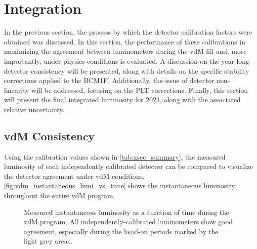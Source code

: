 \newpage

\section{Integration}

In the previous section, the process by which the detector calibration factors were obtained was discussed. In this section, the performance of these calibrations in maximizing the agreement between luminometers during the vdM fill and, more importantly, under physics conditions is evaluated. A discussion on the year-long detector consistency will be presented, along with details on the specific stability corrections applied to the BCM1F. Additionally, the issue of detector non-linearity will be addressed, focusing on the PLT corrections. Finally, this section will present the final integrated luminosity for 2023, along with the associated relative uncertainty.

\newpage

\subsection{vdM Consistency}
\label{subsec:vdm_consistency}

Using the calibration values shown in \autoref{tab:xsec_summary}, the measured luminosity of each independently calibrated detector can be compared to visualize the detector agreement under vdM conditions. \autoref{fig:vdm_instantaneous_lumi_vs_time} shows the instantaneous luminosity throughout the entire vdM program.

\begin{figure}[!htb]
	\centering
	\caption[Instantaneous luminosity during vdM]{Measured instantaneous luminosity as a function of time during the vdM program. All independently-calibrated luminometers show good agreement, especially during the head-on periods marked by the light grey areas.}
	\label{fig:vdm_instantaneous_lumi_vs_time}
\end{figure}


